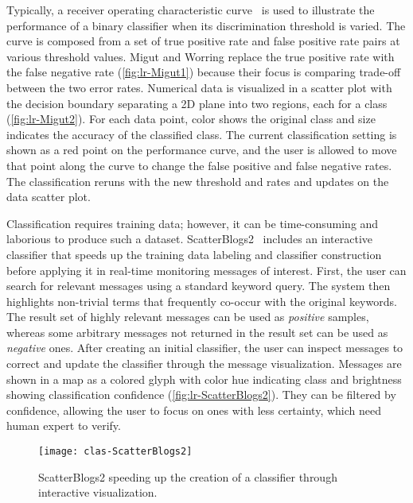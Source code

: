 Typically, a receiver operating characteristic curve~\cite{Fawcett2006} is used to illustrate the performance of a binary classifier when its discrimination threshold is varied. The curve is composed from a set of true positive rate and false positive rate pairs at various threshold values. Migut and Worring replace the true positive rate with the false negative rate (\autoref{fig:lr-Migut1}) because their focus is comparing trade-off between the two error rates. Numerical data is visualized in a scatter plot with the decision boundary separating a 2D plane into two regions, each for a class (\autoref{fig:lr-Migut2}). For each data point, color shows the original class and size indicates the accuracy of the classified class. The current classification setting is shown as a red point on the performance curve, and the user is allowed to move that point along the curve to change the false positive and false negative rates. The classification reruns with the new threshold and rates and updates on the data scatter plot.

Classification requires training data; however, it can be time-consuming and laborious to produce such a dataset. ScatterBlogs2~\cite{Bosch2013} includes an interactive classifier that speeds up the training data labeling and classifier construction before applying it in real-time monitoring messages of interest. First, the user can search for relevant messages using a standard keyword query. The system then highlights non-trivial terms that frequently co-occur with the original keywords. The result set of highly relevant messages can be used as \emph{positive} samples, whereas some arbitrary messages not returned in the result set can be used as \emph{negative} ones. After creating an initial classifier, the user can inspect messages to correct and update the classifier through the message visualization. Messages are shown in a map as a colored glyph with color hue indicating class and brightness showing classification confidence (\autoref{fig:lr-ScatterBlogs2}). They can be filtered by confidence, allowing the user to focus on ones with less certainty, which need human expert to verify. 

\begin{figure}[!htb]
	\centering
	\texttt{[image: clas-ScatterBlogs2]}
	\caption{ScatterBlogs2 speeding up the creation of a classifier through interactive visualization. }
	\label{fig:lr-ScatterBlogs2}
\end{figure}


